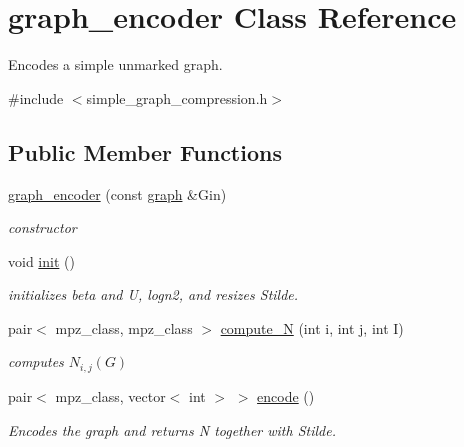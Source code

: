 \hypertarget{classgraph__encoder}{}\section{graph\+\_\+encoder Class Reference}
\label{classgraph__encoder}


Encodes a simple unmarked graph.  




{\ttfamily \#include $<$simple\+\_\+graph\+\_\+compression.\+h$>$}

\subsection*{Public Member Functions}
\begin{DoxyCompactItemize}
\item 
\hyperlink{classgraph__encoder_ac2d2390b126ba3ab21406d0df8757ab6}{graph\+\_\+encoder} (const \hyperlink{classgraph}{graph} \&Gin)
\begin{DoxyCompactList}\small\item\em constructor \end{DoxyCompactList}\item 
void \hyperlink{classgraph__encoder_a197200e714da86ec133ab07bb45e5313}{init} ()
\begin{DoxyCompactList}\small\item\em initializes beta and U, logn2, and resizes Stilde. \end{DoxyCompactList}\item 
pair$<$ mpz\+\_\+class, mpz\+\_\+class $>$ \hyperlink{classgraph__encoder_ad2f997218e6527b869166e778c79672c}{compute\+\_\+N} (int i, int j, int I)
\begin{DoxyCompactList}\small\item\em computes $N_{i,j}(G)$ \end{DoxyCompactList}\item 
pair$<$ mpz\+\_\+class, vector$<$ int $>$ $>$ \hyperlink{classgraph__encoder_a674380f767d1b635f30444f3b499c544}{encode} ()
\begin{DoxyCompactList}\small\item\em Encodes the graph and returns N together with Stilde. \end{DoxyCompactList}\end{DoxyCompactItemize}

